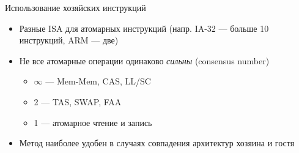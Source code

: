 \documentclass{beamer}
\begin{document}
\begin{frame}{Использование хозяйских инструкций}
\begin{itemize}
    \item Разные ISA для атомарных инструкций (напр. IA-32 --- больше 10 инструкций, ARM --- две)
    \item Не все атомарные операции одинаково \emph{сильны} (consensus number)~\cite{consensus-number}
    \begin{itemize}
        \item $\infty$ --- Mem-Mem, CAS, LL/SC
        \item 2 --- TAS, SWAP, FAA
        \item 1 --- атомарное чтение и запись
    \end{itemize}
    \item Метод наиболее удобен в случаях совпадения архитектур хозяина и гостя
\end{itemize}
\end{frame}
\end{document}
